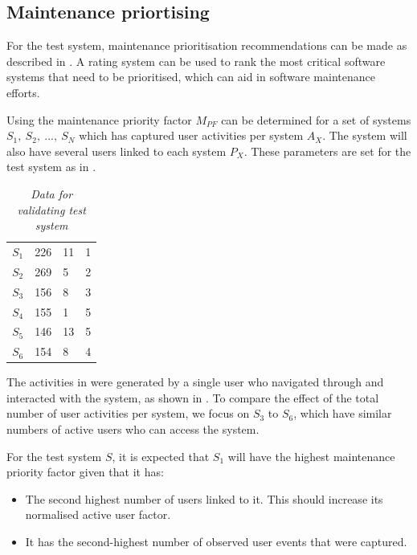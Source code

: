 \subsection{Maintenance priortising}
For the test system, maintenance prioritisation recommendations can be made as described in . A rating system can be used to rank the most critical software systems that need to be prioritised, which can aid in software maintenance efforts.\par Using  the maintenance priority factor $M_{PF}$ can be determined for a set of systems {$S_1,~S_2,~...,~S_N$} which has captured user activities per system $A_X$. The system will also have several users linked to each system $P_X$. These parameters are set for the test system as in .

\begin{table}[!htb]
	\centering
	\caption[Data for validating test system]
	{\textit{Data for validating test system}}
	\label{tbl:ch3_testData}
	\begin{tabularx}{\textwidth}{XXXX}
		\toprule
		\thead{System ($S_X$)} & \thead{Users per system ($P_X$)} & \thead{Number of events ($A_X$)} & \thead{Expected priority} \\
		\midrule
		\rowcolor{lightgray}
		$S_1$ & 226 & 11 & 1 \\
		$S_2$ & 269 & 5 & 2 \\
		\rowcolor{lightgray}
		$S_3$ & 156 & 8 & 3 \\
		$S_4$ & 155 & 1 & 5 \\
		\rowcolor{lightgray}
		$S_5$ & 146 & 13 & 5 \\
		$S_6$ & 154 & 8 & 4 \\
		\bottomrule
	\end{tabularx}
\end{table}

The activities in  were generated by a single user who navigated through and interacted with the system, as shown in . To compare the effect of the total number of user activities per system, we focus on $S_3$ to $S_6$, which have similar numbers of active users who can access the system.\par For the test system $S$, it is expected that $S_1$ will have the highest maintenance priority factor given that it has:

\begin{itemize}
	\item The second highest number of users linked to it. This should increase its normalised active user factor.
	\item It has the second-highest number of observed user events that were captured.
\end{itemize}


